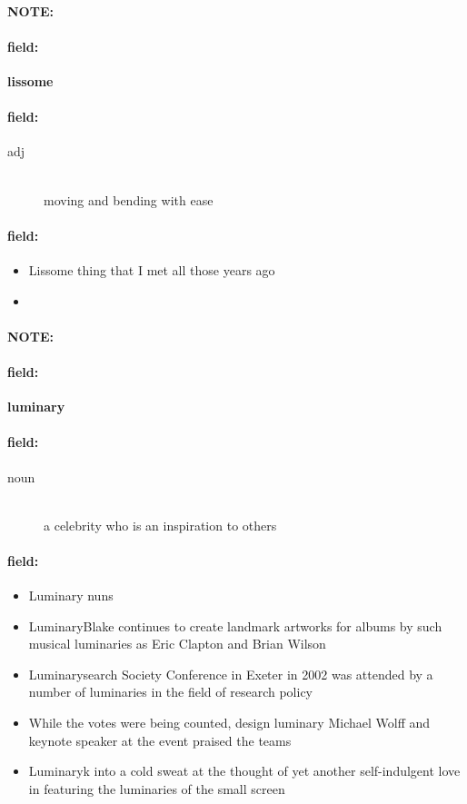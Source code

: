 \documentclass[12pt]{article}
\newenvironment{note}{\paragraph{NOTE:}}{}
\newenvironment{field}{\paragraph{field:}}{}
\begin{document}
\begin{note}
\begin{field}
\textbf{\large lissome}
\end{field}


\begin{field}
\begin{description}
\item[adj] \hfill \\ 
moving and bending with ease

\end{description}
\end{field}

\begin{field}
\begin{itemize}
\item Lissome thing that I met all those years ago
\item 
\end{itemize}
\end{field}
\end{note}
\begin{note}
\begin{field}
\textbf{\large luminary}
\end{field}


\begin{field}
\begin{description}
\item[noun] \hfill \\ 
a celebrity who is an inspiration to others

\end{description}
\end{field}

\begin{field}
\begin{itemize}
\item Luminary nuns
\item LuminaryBlake continues to create landmark artworks for albums by such musical luminaries as Eric Clapton and Brian Wilson
\item Luminarysearch Society Conference in Exeter in 2002 was attended by a number of luminaries in the field of research policy
\item While the votes were being counted, design luminary Michael Wolff and keynote speaker at the event praised the teams
\item Luminaryk into a cold sweat at the thought of yet another self-indulgent love in featuring the luminaries of the small screen
\end{itemize}
\end{field}
\end{note}
\end{document}
